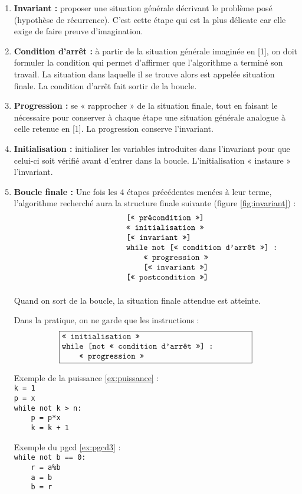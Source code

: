 \begin{enumerate}
\item {\bf Invariant :} proposer une situation générale décrivant le problème posé (hypothèse de
	récurrence). C'est cette étape qui est la plus délicate car elle exige de faire 
	preuve d'imagination.

\item {\bf Condition d'arrêt :} à partir de la situation générale imaginée en [1], on doit
	formuler la condition qui permet d'affirmer que l'algorithme a terminé son travail. 
	La situation dans laquelle il se trouve alors est appelée situation finale.
	La condition d'arrêt fait sortir de la boucle.

\item {\bf Progression :} se « rapprocher » de la situation finale, tout en faisant le nécessaire pour
	conserver à chaque étape une situation générale analogue à celle retenue en [1].
	La progression conserve l'invariant.
	
\item {\bf Initialisation :} initialiser les variables introduites dans l'invariant 
	pour que celui-ci soit vérifié avant d'entrer dans la boucle.
	L'initialisation « instaure » l'invariant.
	
\item {\bf Boucle finale :} Une fois les 4 étapes précédentes menées à leur terme, l'algorithme recherché 
	aura la structure finale suivante (figure \ref{fig:invariant}) :
	$$\begin{minipage}[t]{4cm}
	\begin{verbatim}
	[« précondition »]
	« initialisation »
	[« invariant »]
	while not [« condition d'arrêt »] :
	    « progression »
	    [« invariant »]
	[« postcondition »]
	\end{verbatim}
	\end{minipage}$$
	Quand on sort de la boucle, la situation finale attendue est atteinte.
	
	Dans la pratique, on ne garde que les instructions :
	$$\fbox{\begin{minipage}[t]{8cm}\tt
	« initialisation »\\
	while [not « condition d'arrêt »] : \\
	\mbox{}\ \ \ \ « progression »
	\end{minipage}}$$
	\begin{minipage}[t]{6cm}
	Exemple de la puissance \ref{ex:puissance} :\\
	{\tt k = 1}\\
	{\tt p = x}\\
	{\tt while not k > n: }\\
	{\tt \mbox{}\ \ \ \ p = p*x}\\
	{\tt \mbox{}\ \ \ \ k = k + 1}
	\end{minipage}
	\hfill
	\begin{minipage}[t]{6cm}
	Exemple du pgcd \ref{ex:pgcd3} :\\
	{\tt while not b == 0:}\\
	{\tt \mbox{}\ \ \ \ r = a\%b}\\
	{\tt \mbox{}\ \ \ \ a = b}\\
	{\tt \mbox{}\ \ \ \ b = r}
	\end{minipage}
	

\end{enumerate}
